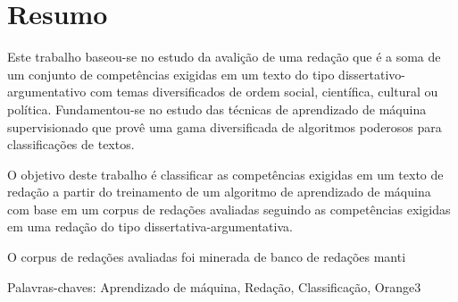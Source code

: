 \chapter*{Resumo}

\noindent Este trabalho baseou-se no estudo da avalição de uma redação que é a 
soma de um conjunto de competências exigidas em um texto do tipo 
dissertativo-argumentativo com temas diversificados de ordem social, 
científica, cultural ou política. Fundamentou-se no estudo das técnicas de 
aprendizado de máquina supervisionado que provê uma gama diversificada de 
algoritmos poderosos para classificações de textos.

O objetivo deste trabalho é classificar as competências exigidas em um texto de 
redação a partir do treinamento de um algoritmo de aprendizado de máquina com
base em um corpus de redações avaliadas seguindo as competências exigidas em 
uma redação do tipo dissertativa-argumentativa.

O corpus de redações avaliadas foi minerada de banco de redações manti

Palavras-chaves: Aprendizado de máquina, Redação, Classificação, Orange3
    